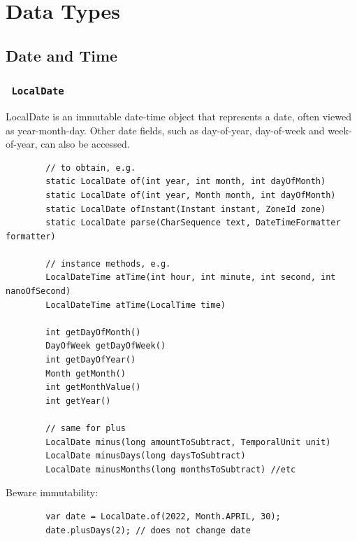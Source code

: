 \documentclass{scrartcl}
\begin{document}

\section{Data Types}

\subsection{Date and Time}

\subsubsection{\lstinline$ LocalDate $}

    LocalDate is an immutable date-time object that represents a date, often viewed as year-month-day. Other date fields, such as day-of-year, day-of-week and week-of-year, can also be accessed.

    \begin{lstlisting}
        // to obtain, e.g.
        static LocalDate of(int year, int month, int dayOfMonth)
        static LocalDate of(int year, Month month, int dayOfMonth)
        static LocalDate ofInstant(Instant instant, ZoneId zone)
        static LocalDate parse(CharSequence text, DateTimeFormatter formatter)

        // instance methods, e.g.
        LocalDateTime atTime(int hour, int minute, int second, int nanoOfSecond)
        LocalDateTime atTime(LocalTime time)

        int getDayOfMonth()
        DayOfWeek getDayOfWeek()
        int getDayOfYear()
        Month getMonth()
        int getMonthValue()
        int getYear()

        // same for plus
        LocalDate minus(long amountToSubtract, TemporalUnit unit)
        LocalDate minusDays(long daysToSubtract)
        LocalDate minusMonths(long monthsToSubtract) //etc
    \end{lstlisting}

    Beware immutability:
    \begin{lstlisting}
        var date = LocalDate.of(2022, Month.APRIL, 30);
        date.plusDays(2); // does not change date
    \end{lstlisting}
\end{document}
